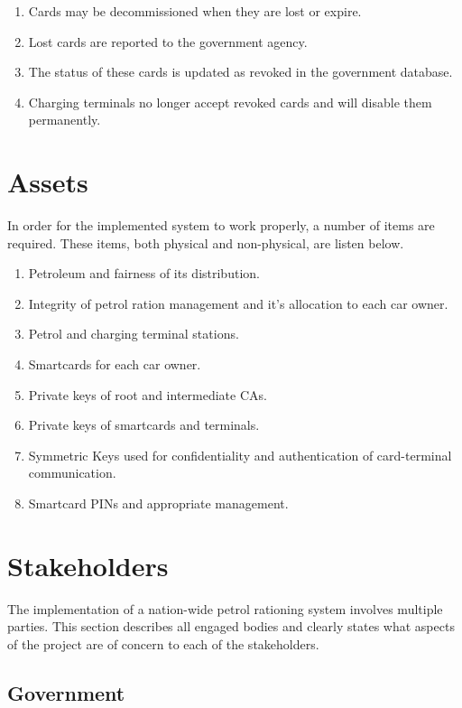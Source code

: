 \documentclass[a4paper,10pt]{llncs}
\begin{document}
\begin{enumerate}
  \item Cards may be decommissioned when they are lost or expire.
  \item Lost cards are reported to the government agency.
  \item The status of these cards is updated as revoked in the government database.
  \item Charging terminals no longer accept revoked cards and will disable them permanently.
\end{enumerate}


\section{Assets}

In order for the implemented system to work properly, a number of items are required. These items, both physical and non-physical, are listen below.

\begin{enumerate}
  \item Petroleum and fairness of its distribution.
  \item Integrity of petrol ration management and it's allocation to each car owner.
  \item Petrol and charging terminal stations.
  \item Smartcards for each car owner.
  \item Private keys of root and intermediate CAs.
  \item Private keys of smartcards and terminals.
  \item Symmetric Keys used for confidentiality and authentication of card-terminal communication.
  \item Smartcard PINs and appropriate management.
\end{enumerate}

\section{Stakeholders}
The implementation of a nation-wide petrol rationing system involves multiple parties. This section describes all engaged bodies and clearly states what aspects of the project are of concern to each of the stakeholders.

\subsection{Government}
\end{document}
